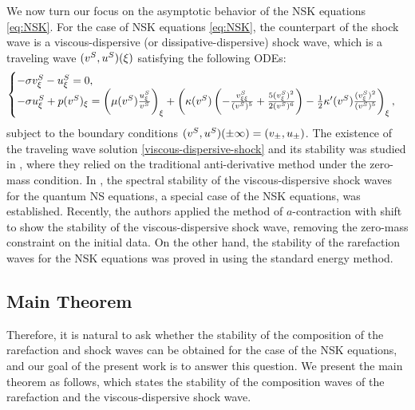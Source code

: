 \documentclass[11pt,reqno]{amsart}
\begin{document}
We now turn our focus on the asymptotic behavior of the NSK equations \eqref{eq:NSK}. For the case of NSK equations \eqref{eq:NSK}, the counterpart of the shock wave is a viscous-dispersive (or dissipative-dispersive) shock wave, which is a traveling wave $(v^S,u^S)(\xi)$ satisfying the following ODEs:
\begin{equation}\label{viscous-dispersive-shock}
\begin{cases}
-\sigma v^S_\xi-u^S_\xi=0,\\
-\sigma u^S_\xi+p(v^S)_\xi=\left(\mu(v^S)\frac{u^S_\xi}{v^S}\right)_\xi + \left( \kappa(v^S) \left(  -\frac{v^S_{\xi\xi}}{(v^S)^5} + \frac{5(v^S_\xi)^2}{2(v^S)^6}\right)-\frac{1}{2} \kappa'(v^S) \frac{(v^S_\xi)^2}{(v^S)^5} \right)_\xi,
\end{cases}
\end{equation}
subject to the boundary conditions $(v^S,u^S)(\pm\infty)=(v_\pm,u_\pm)$. The existence of the traveling wave solution \eqref{viscous-dispersive-shock} and its stability was studied in \cite{CHZ15}, where they relied on the traditional anti-derivative method under the zero-mass condition. In \cite{FPZ23}, the spectral stability of the viscous-dispersive shock waves for the quantum NS equations, a special case of the NSK equations, was established. Recently, the authors applied the method of $a$-contraction with shift to show the stability of the viscous-dispersive shock wave, removing the zero-mass constraint on the initial data. On the other hand, the stability of the rarefaction waves for the NSK equations was proved in \cite{C12} using the standard energy method.

\subsection{Main Theorem}
Therefore, it is natural to ask whether the stability of the composition of the rarefaction and shock waves can be obtained for the case of the NSK equations, and our goal of the present work is to answer this question. We present the main theorem as follows, which states the stability of the composition waves of the rarefaction and the viscous-dispersive shock wave.
    
\end{document}
